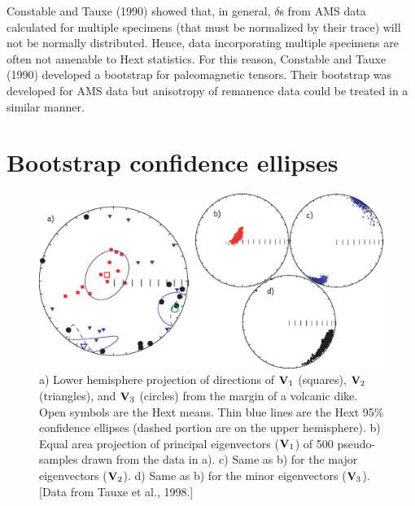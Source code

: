 Constable and Tauxe (1990)
showed that, in general, $\delta$s from AMS data calculated for
 multiple specimens (that must be normalized by their trace) will not 
 be normally distributed.  Hence, data incorporating multiple specimens
 are often not amenable to Hext statistics.   For this reason, Constable and Tauxe (1990) developed a 
 bootstrap for  paleomagnetic tensors.  Their bootstrap was developed for  AMS data but anisotropy of remanence data could be treated in a similar manner.  

\section {Bootstrap confidence ellipses}



\begin{figure} [htb]
\centering  \includegraphics[width=14 cm]{EPSfiles/evec.eps}
\caption{
a) Lower hemisphere projection of directions of
 $\hbox{\bf V}_1$ (squares), $\hbox{\bf V}_2$ (triangles), and $\hbox{\bf V}_3$ (circles) from the 
margin of a volcanic dike.   Open symbols are the Hext means.  Thin blue lines are the Hext 95\% confidence ellipses (dashed portion are on the upper hemisphere).  
b) Equal area projection of  principal eigenvectors 
($\hbox{\bf V}_1$)  of 500 pseudo-samples drawn from the data in a). c) Same as b) for the 
major eigenvectors  ($\hbox{\bf V}_2$).
d) Same as b) for the minor eigenvectors ($\hbox{\bf V}_3$).  [Data from Tauxe et al., 1998.]}
\label{fig:evec}
\end{figure}
\nocite{tauxe98b}

